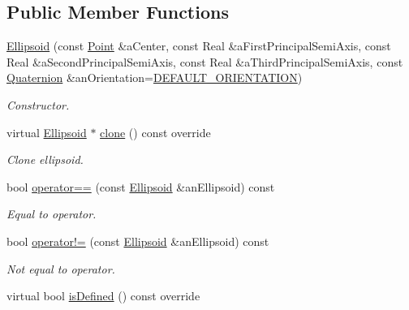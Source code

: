 \subsection*{Public Member Functions}
\begin{DoxyCompactItemize}
\item 
\hyperlink{classostk_1_1math_1_1geom_1_1d3_1_1objects_1_1_ellipsoid_a106c71abf9503f3d06b2613c1c7e9d65}{Ellipsoid} (const \hyperlink{classostk_1_1math_1_1geom_1_1d3_1_1objects_1_1_point}{Point} \&a\+Center, const Real \&a\+First\+Principal\+Semi\+Axis, const Real \&a\+Second\+Principal\+Semi\+Axis, const Real \&a\+Third\+Principal\+Semi\+Axis, const \hyperlink{classostk_1_1math_1_1geom_1_1d3_1_1trf_1_1rot_1_1_quaternion}{Quaternion} \&an\+Orientation=\hyperlink{_ellipsoid_8hpp_a5c684aeaeb24d197904b5a34839d2dd9}{D\+E\+F\+A\+U\+L\+T\+\_\+\+O\+R\+I\+E\+N\+T\+A\+T\+I\+ON})
\begin{DoxyCompactList}\small\item\em Constructor. \end{DoxyCompactList}\item 
virtual \hyperlink{classostk_1_1math_1_1geom_1_1d3_1_1objects_1_1_ellipsoid}{Ellipsoid} $\ast$ \hyperlink{classostk_1_1math_1_1geom_1_1d3_1_1objects_1_1_ellipsoid_a00899cd0b86395c4beef6947497bfe82}{clone} () const override
\begin{DoxyCompactList}\small\item\em Clone ellipsoid. \end{DoxyCompactList}\item 
bool \hyperlink{classostk_1_1math_1_1geom_1_1d3_1_1objects_1_1_ellipsoid_add7aa81a702b745d73f44b81359ecc4b}{operator==} (const \hyperlink{classostk_1_1math_1_1geom_1_1d3_1_1objects_1_1_ellipsoid}{Ellipsoid} \&an\+Ellipsoid) const
\begin{DoxyCompactList}\small\item\em Equal to operator. \end{DoxyCompactList}\item 
bool \hyperlink{classostk_1_1math_1_1geom_1_1d3_1_1objects_1_1_ellipsoid_aaeed509e3703368fe9f0513d5807f9cb}{operator!=} (const \hyperlink{classostk_1_1math_1_1geom_1_1d3_1_1objects_1_1_ellipsoid}{Ellipsoid} \&an\+Ellipsoid) const
\begin{DoxyCompactList}\small\item\em Not equal to operator. \end{DoxyCompactList}\item 
virtual bool \hyperlink{classostk_1_1math_1_1geom_1_1d3_1_1objects_1_1_ellipsoid_a21c465d185052a1631fe3ddcc131512d}{is\+Defined} () const override

\end{DoxyCompactItemize}
